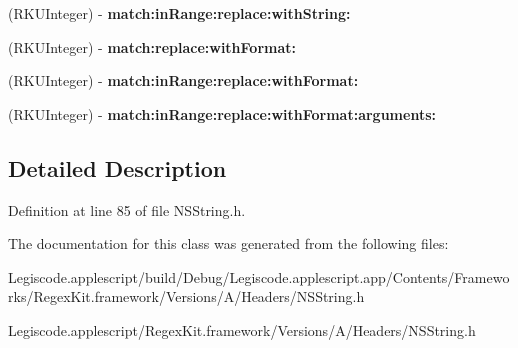 \begin{DoxyCompactItemize}
\item 
\hypertarget{interface_n_s_mutable_string_07_regex_kit_additions_08_a8efcb6d01932a250278cad5af37e76a6}{(R\-K\-U\-Integer) -\/ {\bfseries match\-:in\-Range\-:replace\-:with\-String\-:}}\label{interface_n_s_mutable_string_07_regex_kit_additions_08_a8efcb6d01932a250278cad5af37e76a6}

\item 
\hypertarget{interface_n_s_mutable_string_07_regex_kit_additions_08_aab5f247bd3a01bbc663625df0752c3fb}{(R\-K\-U\-Integer) -\/ {\bfseries match\-:replace\-:with\-Format\-:}}\label{interface_n_s_mutable_string_07_regex_kit_additions_08_aab5f247bd3a01bbc663625df0752c3fb}

\item 
\hypertarget{interface_n_s_mutable_string_07_regex_kit_additions_08_a5d069dd4e5caa58cd6f2e31b7821e8bf}{(R\-K\-U\-Integer) -\/ {\bfseries match\-:in\-Range\-:replace\-:with\-Format\-:}}\label{interface_n_s_mutable_string_07_regex_kit_additions_08_a5d069dd4e5caa58cd6f2e31b7821e8bf}

\item 
\hypertarget{interface_n_s_mutable_string_07_regex_kit_additions_08_a9eee815b73d0cd248a0c8a0dee9a3a75}{(R\-K\-U\-Integer) -\/ {\bfseries match\-:in\-Range\-:replace\-:with\-Format\-:arguments\-:}}\label{interface_n_s_mutable_string_07_regex_kit_additions_08_a9eee815b73d0cd248a0c8a0dee9a3a75}

\end{DoxyCompactItemize}


\subsection{Detailed Description}


Definition at line 85 of file N\-S\-String.\-h.



The documentation for this class was generated from the following files\-:\begin{DoxyCompactItemize}
\item 
Legiscode.\-applescript/build/\-Debug/\-Legiscode.\-applescript.\-app/\-Contents/\-Frameworks/\-Regex\-Kit.\-framework/\-Versions/\-A/\-Headers/N\-S\-String.\-h\item 
Legiscode.\-applescript/\-Regex\-Kit.\-framework/\-Versions/\-A/\-Headers/N\-S\-String.\-h\end{DoxyCompactItemize}
